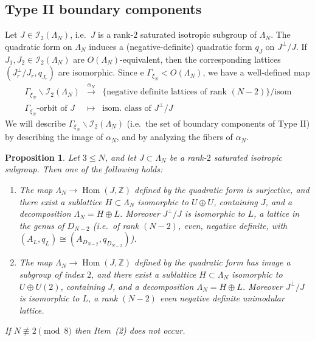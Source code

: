 \documentclass[11pt]{amsart}
\numberwithin{equation}{section}
\theoremstyle{plain}
\newtheorem{proposition}[theorem]{Proposition}
\theoremstyle{remark}
\theoremstyle{definition}
\def\Hom{\operatorname{Hom}}
\newcommand{\cI}{{\mathscr I}}
\newcommand{\lra}{\longrightarrow}
\newcommand{\ZZ}{{\mathbb Z}}
\begin{document}
\subsection{Type II boundary components}
%
Let $J\in\cI_2(\Lambda_N)$, i.e.~$J$ is a rank-$2$ saturated isotropic subgroup of $\Lambda_N$. The quadratic form on $\Lambda_N$ induces a (negative-definite) quadratic form $q_J$ on $J^{\bot}/J$. If $J_1,J_2\in\cI_2(\Lambda_N)$ are $O(\Lambda_N)$-equivalent, then the corresponding  lattices $(J_r^{\bot}/J_r,q_{J_r})$ are isomorphic. Since e $\Gamma_{\xi_N}< O(\Lambda_N)$, we have a well-defined map 
%
\begin{equation}\label{mappalfa}
%
\begin{matrix}
%
\scriptstyle
%
\Gamma_{\xi_N}\backslash \cI_2(\Lambda_N) & \scriptstyle \overset{\alpha_N} {\lra} & 
 \scriptstyle\{\text{negative definite lattices of rank $(N-2)$}\}/\text{isom} \\
\scriptstyle \text{$\Gamma_{\xi_N}$-orbit of $J$} & \scriptstyle\mapsto &  \scriptstyle\text{isom.~class   of $J^{\bot}/J$}
%
\end{matrix}
%
\end{equation}
%
We will describe $\Gamma_{\xi_N}\backslash \cI_2(\Lambda_N)$ (i.e.~the set of boundary components of Type II) by describing the image of $\alpha_N$, and by analyzing the fibers of $\alpha_N$.
%
\begin{proposition}\label{prp:isoexe}
%
Let $3\le N$, and let  $J\subset\Lambda_N$ be a rank-$2$ saturated isotropic subgroup. Then 
one of the following holds:
%
\begin{enumerate}
%
\item 
%
The map $\Lambda_N\to \Hom(J,\ZZ)$ defined by the quadratic form is surjective, and there exist a 
  sublattice  $H\subset\Lambda_N$  isomorphic to $U\oplus U$, containing $J$, and a decomposition $\Lambda_N=H \oplus L$. Moreover   $J^{\bot}/J$ is  isomorphic to $L$, a lattice in the genus of $D_{N-2}$  (i.e.~of rank $(N-2)$,  even, negative definite, with $(A_L,q_L)\cong (A_{D_{N-2}},q_{D_{N-2}})$).
%
\item 
%
The map $\Lambda_N\to  \Hom(J,\ZZ)$ defined by the quadratic form has image a subgroup of index $2$, and there exist a 
  sublattice  $H\subset\Lambda_N$  isomorphic to $U\oplus U(2)$, containing $J$, and a decomposition $\Lambda_N=H \oplus L$. Moreover  $J^{\bot}/J$ is isomorphic to $L$,  a  rank $(N-2)$  even negative definite unimodular lattice.
% 
\end{enumerate}
%
If $N\not\equiv 2\pmod{8}$ then Item~(2) does not occur.
%
\end{proposition}
%
\end{document}
